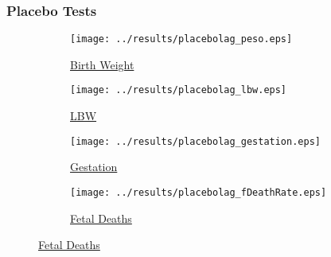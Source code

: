 \documentclass[10pt,letterpaper,subeqn,table]{beamer}
\begin{document}
%

\begin{frame}[label=Placebo]
\frametitle{Placebo Tests}
\begin{figure}[htpb!]
  \begin{center}
    \begin{subfigure}{.5\textwidth}
      \centering
      \texttt{[image: ../results/placebolag\_peso.eps]}
      \caption{\hyperlink{allPlaceboBW}{Birth Weight}}
      \label{placebo-peso}
    \end{subfigure}%
    \begin{subfigure}{.5\textwidth}
      \centering
      \texttt{[image: ../results/placebolag\_lbw.eps]}
      \caption{\hyperlink{allPlaceboLBW}{LBW}}
      \label{placebo-lbw}
    \end{subfigure}
    \begin{subfigure}{.5\textwidth}
      \centering
      \texttt{[image: ../results/placebolag\_gestation.eps]}
      \caption{\hyperlink{allPlaceboGest}{Gestation}}
      \label{placebo-gest}
    \end{subfigure}%
    \begin{subfigure}{.5\textwidth}
      \centering
      \texttt{[image: ../results/placebolag\_fDeathRate.eps]}
      \caption{\hyperlink{allPlaceboFD}{Fetal Deaths}}
      \label{placebo-fdeaths}
    \end{subfigure}
  \end{center}
\end{figure}
\end{frame}
\end{document}
